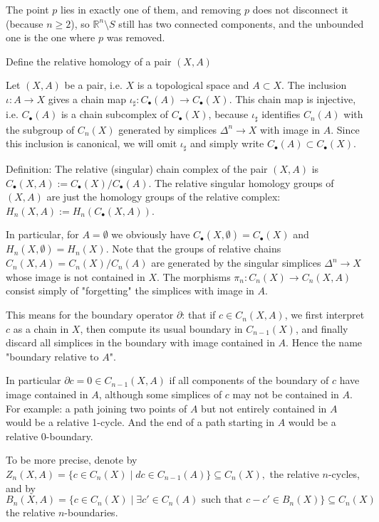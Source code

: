 The point \(p\) lies in exactly one of them, and removing \(p\) does not disconnect it (because \(n \geq 2\)), 
so \(\mathbb{R}^n \setminus S\) still has two connected components, and the unbounded one is the one where \(p\) was removed.

Define the relative homology of a pair \( (X, A) \)

Let \((X, A)\) be a pair, i.e. \(X\) is a topological space and \(A \subset X\). 
The inclusion \(\iota: A \to X\) gives a chain map \(\iota_\sharp: C_\bullet(A) \to C_\bullet(X)\). 
This chain map is injective, i.e. \(C_\bullet(A)\) is a chain subcomplex of \(C_\bullet(X)\), 
because \(\iota_\sharp\) identifies \(C_n(A)\) with the subgroup of \(C_n(X)\) generated by simplices \(\Delta^n \to X\) with image in \(A\). 
Since this inclusion is canonical, we will omit \(\iota_\sharp\) and simply write \(C_\bullet(A) \subset C_\bullet(X)\). 

Definition: 
The relative (singular) chain complex of the pair \((X, A)\) is \(C_\bullet(X, A) := C_\bullet(X) / C_\bullet(A)\).
The relative singular homology groups of \((X, A)\) are just the homology groups of the relative complex: \(H_n(X, A) := H_n(C_\bullet(X, A))\).

In particular, for \(A = \emptyset\) we obviously have \(C_\bullet(X, \emptyset) = C_\bullet(X)\) and \(H_n(X, \emptyset) = H_n(X)\).
Note that the groups of relative chains \(C_n(X, A) = C_n(X) / C_n(A)\) are generated 
by the singular simplices \(\Delta^n \to X\) whose image is not contained in \(X\). 
The morphisms \(\pi_n: C_n(X) \to C_n(X, A)\) consist simply of "forgetting" the simplices with image in \(A\).


This means for the boundary operator \( \partial \): that if \(c \in C_n(X, A)\), we first interpret \(c\) as a chain in \(X\), 
then compute its usual boundary in \(C_{n-1}(X)\), 
and finally discard all simplices in the boundary with image contained in \(A\). Hence the name "boundary relative to \(A\)".

In particular \(\partial c = 0 \in C_{n-1}(X, A)\) if all components of the boundary of \(c\) have image contained in \(A\), 
although some simplices of \(c\) may not be contained in \(A\). 
For example: a path joining two points of \(A\) but not entirely contained in \(A\) would be a relative 1-cycle. 
And the end of a path starting in \(A\) would be a relative 0-boundary.

To be more precise, denote by 
\(Z_n(X, A) = \{c \in C_n(X) \mid dc \in C_{n-1}(A)\} \subseteq C_n(X),\)
the relative \(n\)-cycles, and by
\(B_n(X, A) = \{c \in C_n(X) \mid \exists c' \in C_n(A) \text{ such that } c - c' \in B_n(X)\} \subseteq C_n(X)\)
the relative \(n\)-boundaries.

